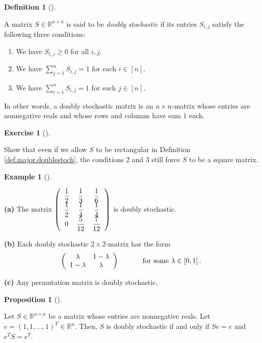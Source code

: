 \documentclass[numbers=enddot,12pt,final,onecolumn,notitlepage]{scrartcl}%
\newcounter{exer}
\numberwithin{exer}{subsection}
\theoremstyle{definition}
\newtheorem{prop}[theo]{Proposition}
\newenvironment{proposition}[1][]
{\begin{prop}[#1]\begin{leftbar}}
{\end{leftbar}\end{prop}}
\newtheorem{defi}[theo]{Definition}
\newenvironment{definition}[1][]
{\begin{defi}[#1]\begin{leftbar}}
{\end{leftbar}\end{defi}}
\newtheorem{exam}[theo]{Example}
\newenvironment{example}[1][]
{\begin{exam}[#1]\begin{leftbar}}
{\end{leftbar}\end{exam}}
\newtheorem{exmp}[exer]{Exercise}
\newenvironment{exercise}[1][]
{\begin{exmp}[#1]\begin{leftbar}}
{\end{leftbar}\end{exmp}}
\let\sumnonlimits\sum
\renewcommand{\sum}{\sumnonlimits\limits}
\begin{document}
\begin{definition}
\label{def.major.doublestoch}A matrix $S\in\mathbb{R}^{n\times n}$ is said to
be \emph{doubly stochastic} if its entries $S_{i,j}$ satisfy the following
three conditions:

\begin{enumerate}
\item We have $S_{i,j}\geq0$ for all $i,j$.

\item We have $\sum_{j=1}^{n}S_{i,j}=1$ for each $i\in\left[  n\right]  $.

\item We have $\sum_{i=1}^{n}S_{i,j}=1$ for each $j\in\left[  n\right]  $.
\end{enumerate}
\end{definition}

In other words, a doubly stochastic matrix is an $n\times n$-matrix whose
entries are nonnegative reals and whose rows and columns have sum $1$ each.

\begin{exercise}
\label{exe.major.doublestoch.square} Show that even if we allow $S$ to
be rectangular in Definition \ref{def.major.doublestoch}, the conditions 2 and
3 still force $S$ to be a square matrix.
\end{exercise}

\begin{example}
\label{exa.major.doublestoch.exas}\textbf{(a)} The matrix $\left(
\begin{array}
[c]{ccc}%
\dfrac{1}{2} & \dfrac{1}{3} & \dfrac{1}{6}\\
\dfrac{1}{2} & \dfrac{1}{4} & \dfrac{1}{4}\\
0 & \dfrac{5}{12} & \dfrac{7}{12}%
\end{array}
\right)  $ is doubly stochastic. \medskip

\textbf{(b)} Each doubly stochastic $2\times2$-matrix has the form%
\[
\left(
\begin{array}
[c]{cc}%
\lambda & 1-\lambda\\
1-\lambda & \lambda
\end{array}
\right)  \ \ \ \ \ \ \ \ \ \ \text{for some }\lambda\in\left[  0,1\right]  .
\]


\textbf{(c)} Any permutation matrix is doubly stochastic.
\end{example}

\begin{proposition}
\label{prop.major.doublestoch.e}Let $S\in\mathbb{R}^{n\times n}$ be a matrix
whose entries are nonnegative reals. Let $e=\left(  1,1,\ldots,1\right)
^{T}\in\mathbb{R}^{n}$. Then, $S$ is doubly stochastic if and only if $Se=e$
and $e^{T}S=e^{T}$.
\end{proposition}
\end{document}
